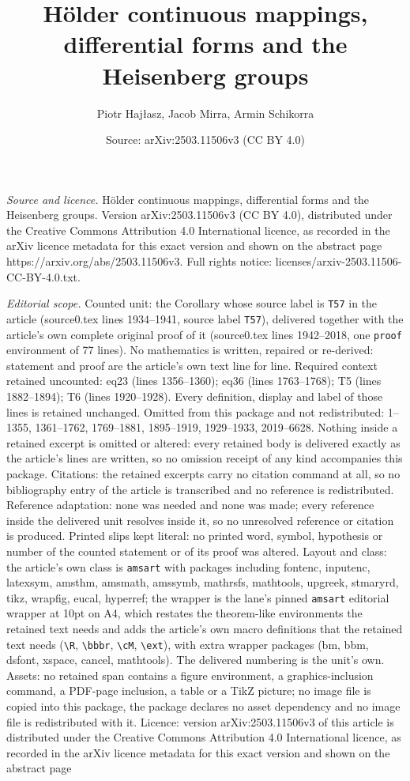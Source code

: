 \documentclass[10pt,a4paper]{amsart}
\title[H\"older continuous mappings, differential forms and the Hei]{H\"older continuous mappings, differential forms and the Heisenberg groups}
\author{Piotr Haj{\l}asz, Jacob Mirra, Armin Schikorra}
\date{Source: arXiv:2503.11506v3 (CC BY 4.0)}
\begin{document}
\maketitle

\noindent\emph{Source and licence.} H\"older continuous mappings, differential forms and the Heisenberg groups. Version arXiv:2503.11506v3 (CC BY 4.0), distributed under the Creative Commons Attribution 4.0 International licence, as recorded in the arXiv licence metadata for this exact version and shown on the abstract page https://arxiv.org/abs/2503.11506v3. Full rights notice: licenses/arxiv-2503.11506-CC-BY-4.0.txt.\par\smallskip

\noindent\textit{Editorial scope.} Counted unit: the Corollary whose source label is \texttt{T57} in the article (source0.tex lines 1934--1941, source label \texttt{T57}), delivered together with the article's own complete original proof of it (source0.tex lines 1942--2018, one \texttt{proof} environment of 77 lines). No mathematics is written, repaired or re-derived: statement and proof are the article's own text line for line. Required context retained uncounted: eq23 (lines 1356--1360); eq36 (lines 1763--1768); T5 (lines 1882--1894); T6 (lines 1920--1928). Every definition, display and label of those lines is retained unchanged. Omitted from this package and not redistributed: 1--1355, 1361--1762, 1769--1881, 1895--1919, 1929--1933, 2019--6628. Nothing inside a retained excerpt is omitted or altered: every retained body is delivered exactly as the article's lines are written, so no omission receipt of any kind accompanies this package. Citations: the retained excerpts carry no citation command at all, so no bibliography entry of the article is transcribed and no reference is redistributed. Reference adaptation: none was needed and none was made; every reference inside the delivered unit resolves inside it, so no unresolved reference or citation is produced. Printed slips kept literal: no printed word, symbol, hypothesis or number of the counted statement or of its proof was altered. Layout and class: the article's own class is \texttt{amsart} with packages including fontenc, inputenc, latexsym, amsthm, amsmath, amssymb, mathrsfs, mathtools, upgreek, stmaryrd, tikz, wrapfig, eucal, hyperref; the wrapper is the lane's pinned \texttt{amsart} editorial wrapper at 10pt on A4, which restates the theorem-like environments the retained text needs and adds the article's own macro definitions that the retained text needs (\texttt{\textbackslash R}, \texttt{\textbackslash bbbr}, \texttt{\textbackslash cM}, \texttt{\textbackslash ext}), with extra wrapper packages (bm, bbm, dsfont, xspace, cancel, mathtools). The delivered numbering is the unit's own. Assets: no retained span contains a figure environment, a graphics-inclusion command, a PDF-page inclusion, a table or a TikZ picture; no image file is copied into this package, the package declares no asset dependency and no image file is redistributed with it. Licence: version arXiv:2503.11506v3 of this article is distributed under the Creative Commons Attribution 4.0 International licence, as recorded in the arXiv licence metadata for this exact version and shown on the abstract page 
\end{document}
